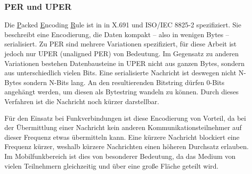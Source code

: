 \subsubsection{PER und UPER}

Die \underline{P}acked \underline{E}ncoding \underline{R}ule ist in in X.691 \cite{asn:itu:x691} und ISO/IEC 8825-2 \cite{asn:iso} spezifiziert.
Sie beschreibt eine Encodierung, die Daten kompakt -- also in wenigen Bytes -- serialisiert.
Zu PER sind mehrere Variationen spezifiziert, für diese Arbeit ist jedoch nur UPER (unaligned PER) von Bedeutung.
Im Gegensatz zu anderen Variationen bestehen Datenbausteine in UPER nicht aus ganzen Bytes, sondern aus unterschiedlich vielen Bits.
Eine serialisierte Nachricht ist deswegen nicht N-Bytes sondern N-Bits lang.
An den resultierenden Bitstring dürfen 0-Bits angehängt werden, um diesen als Bytestring wandeln zu können.
Durch dieses Verfahren ist die Nachricht noch kürzer darstellbar.

Für den Einsatz bei Funkverbindungen ist diese Encodierung von Vorteil, da bei der Übermittlung einer Nachricht kein anderen Kommunikationsteilnehmer auf dieser Frequenz etwas übermitteln kann.
Eine kürzere Nachricht blockiert eine Frequenz kürzer, weshalb kürzere Nachrichten einen höheren Durchsatz erlauben.
Im Mobilfunkbereich ist dies von besonderer Bedeutung, da das Medium von vielen Teilnehmern gleichzeitig und über eine große Fläche geteilt wird. 